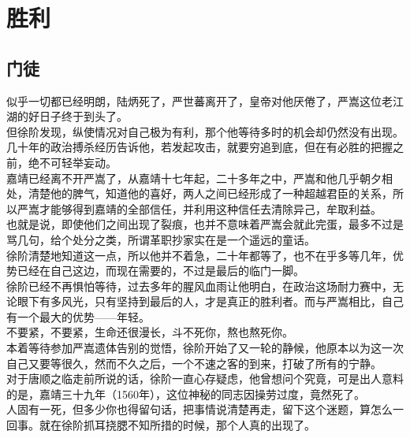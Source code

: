 \section{胜利}
\ifnum{}
	\begin{multicols}{\theparacolNo}
\fi
\subsection{门徒}
似乎一切都已经明朗，陆炳死了，严世蕃离开了，皇帝对他厌倦了，严嵩这位老江湖的好日子终于到头了。\\

但徐阶发现，纵使情况对自己极为有利，那个他等待多时的机会却仍然没有出现。几十年的政治搏杀经历告诉他，若发起攻击，就要穷追到底，但在有必胜的把握之前，绝不可轻举妄动。\\

嘉靖已经离不开严嵩了，从嘉靖十七年起，二十多年之中，严嵩和他几乎朝夕相处，清楚他的脾气，知道他的喜好，两人之间已经形成了一种超越君臣的关系，所以严嵩才能够得到嘉靖的全部信任，并利用这种信任去清除异己，牟取利益。\\

也就是说，即使他们之间出现了裂痕，也并不意味着严嵩会就此完蛋，最多不过是骂几句，给个处分之类，所谓革职抄家实在是一个遥远的童话。\\

徐阶清楚地知道这一点，所以他并不着急，二十年都等了，也不在乎多等几年，优势已经在自己这边，而现在需要的，不过是最后的临门一脚。\\

徐阶已经不再惧怕等待，过去多年的腥风血雨让他明白，在政治这场耐力赛中，无论眼下有多风光，只有坚持到最后的人，才是真正的胜利者。而与严嵩相比，自己有一个最大的优势——年轻。\\

不要紧，不要紧，生命还很漫长，斗不死你，熬也熬死你。\\

本着等待参加严嵩遗体告别的觉悟，徐阶开始了又一轮的静候，他原本以为这一次自己又要等很久，然而不久之后，一个不速之客的到来，打破了所有的宁静。\\

对于唐顺之临走前所说的话，徐阶一直心存疑虑，他曾想问个究竟，可是出人意料的是，嘉靖三十九年（1560年），这位神秘的同志因操劳过度，竟然死了。\\

人固有一死，但多少你也得留句话，把事情说清楚再走，留下这个迷题，算怎么一回事。就在徐阶抓耳挠腮不知所措的时候，那个人真的出现了。\\


\end{multicols}
